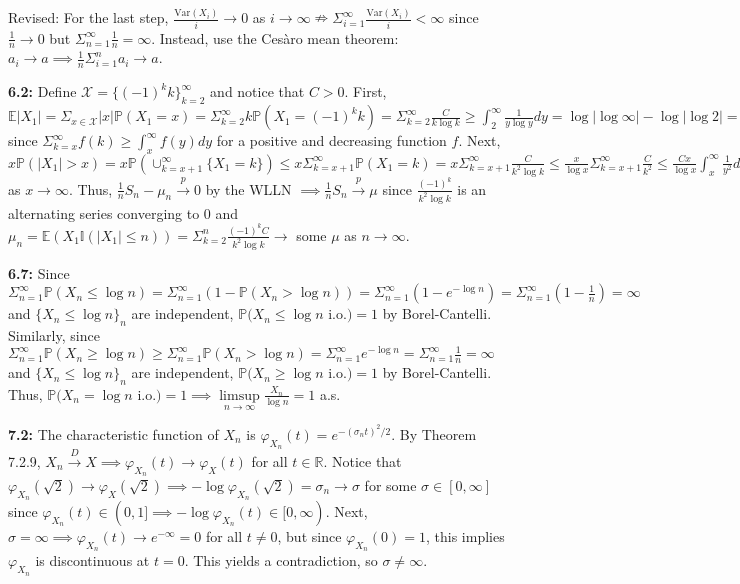 \documentclass[12pt]{article}
\newcommand{\E}{\mathbb{E}}
\newcommand{\I}{\mathbb{I}}
\newcommand{\p}{\mathbb{P}}
\newcommand{\V}{\text{Var}}
\begin{document}
Revised: For the last step, $\frac{\V(X_i)}{i} \to 0$ as $i \to \infty \nRightarrow \Sigma_{i=1}^\infty \frac{\V(X_i)}{i} < \infty$ since $\frac{1}{n} \to 0$ but $\Sigma_{n=1}^\infty \frac{1}{n} = \infty$. Instead, use the Cesàro mean theorem: $a_i \to a \implies \frac{1}{n}\Sigma_{i=1}^n a_i \to a$.

\textbf{6.2:} Define $\mathcal{X} = \{(-1)^k k\}_{k=2}^\infty$ and notice that $C > 0$. First, $\E|X_1| = \Sigma_{x\in\mathcal{X}} |x|\p(X_1 = x) = \Sigma_{k=2}^\infty k\p(X_1 = (-1)^k k) = \Sigma_{k=2}^\infty \frac{C}{k\log k} \geq \int_2^\infty \frac{1}{y\log y}dy = \log|\log \infty| - \log|\log 2| = \infty$ since $\Sigma_{k=x}^\infty f(k) \geq \int_x^\infty f(y)dy$ for a positive and decreasing function $f$. Next, $x\p(|X_1| > x) = x\p(\cup_{k=x+1}^\infty \{X_1 = k\}) \leq x\Sigma_{k=x+1}^\infty \p(X_1 = k) = x\Sigma_{k=x+1}^\infty \frac{C}{k^2 \log k} \leq \frac{x}{\log x} \Sigma_{k=x+1}^\infty \frac{C}{k^2} \leq \frac{Cx}{\log x} \int_x^\infty \frac{1}{y^2}dy = \frac{Cx}{\log x} (0 + \frac{1}{x}) = \frac{C}{\log x} \to 0$ as $x \to \infty$. Thus, $\frac{1}{n}S_n - \mu_n \overset{p}{\to} 0$ by the WLLN $\implies \frac{1}{n}S_n \overset{p}{\to} \mu$ since $\frac{(-1)^k}{k^2 \log k}$ is an alternating series converging to 0 and $\mu_n = \E(X_1 \I(|X_1| \leq n)) = \Sigma_{k=2}^n \frac{(-1)^k C}{k^2 \log k} \to$ some $\mu$ as $n \to \infty$.

\textbf{6.7:} Since $\Sigma_{n=1}^\infty \p(X_n \leq \log n) = \Sigma_{n=1}^\infty (1 - \p(X_n > \log n)) = \Sigma_{n=1}^\infty (1 - e^{-\log n}) = \Sigma_{n=1}^\infty (1 - \frac{1}{n}) = \infty$ and $\{X_n \leq \log n\}_n$ are independent, $\p(X_n \leq \log n$ i.o.$) = 1$ by Borel-Cantelli. Similarly, since $\Sigma_{n=1}^\infty \p(X_n \geq \log n) \geq \Sigma_{n=1}^\infty \p(X_n > \log n) = \Sigma_{n=1}^\infty e^{-\log n} = \Sigma_{n=1}^\infty \frac{1}{n} = \infty$ and $\{X_n \leq \log n\}_n$ are independent, $\p(X_n \geq \log n$ i.o.$) = 1$ by Borel-Cantelli. Thus, $\p(X_n = \log n$ i.o.$) = 1 \implies \limsup \limits_{n\to\infty} \frac{X_n}{\log n} = 1$ a.s.

\textbf{7.2:} The characteristic function of $X_n$ is $\varphi_{X_n}(t) = e^{-(\sigma_n t)^2/2}$. By Theorem 7.2.9, $X_n \overset{D}{\to} X \implies \varphi_{X_n}(t) \to \varphi_X(t)$ for all $t \in \mathbb{R}$. Notice that $\varphi_{X_n}(\sqrt{2}) \to \varphi_X(\sqrt{2}) \implies -\log \varphi_{X_n}(\sqrt{2}) = \sigma_n \to \sigma$ for some $\sigma \in [0,\infty]$ since $\varphi_{X_n}(t) \in (0,1] \implies -\log \varphi_{X_n}(t) \in [0,\infty)$. Next, $\sigma = \infty \implies \varphi_{X_n}(t) \to e^{-\infty} = 0$ for all $t \neq 0$, but since $\varphi_{X_n}(0) = 1$, this implies $\varphi_{X_n}$ is discontinuous at $t = 0$. This yields a contradiction, so $\sigma \neq \infty$.
\end{document}

